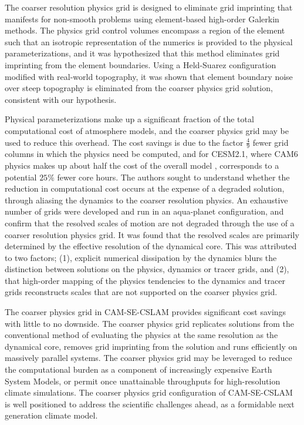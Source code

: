 \documentclass{agujournal}
\begin{document}
The coarser resolution physics grid is designed to eliminate grid imprinting that manifests for non-smooth problems using element-based high-order Galerkin methods. The physics grid control volumes encompass a region of the element such that an isotropic representation of the numerics is provided to the physical parameterizations, and it was hypothesized that this method eliminates grid imprinting from the element boundaries. Using a Held-Suarez configuration modified with real-world topography, it was shown that element boundary noise over steep topography is eliminated from the coarser physics grid solution, consistent with our hypothesis.

Physical parameterizations make up a significant fraction of the total computational cost of atmosphere models, and the coarser physics grid may be used to reduce this overhead. The cost savings is due to the factor $\frac{4}{9}$ fewer grid columns in which the physics need be computed, and for CESM2.1, where CAM6 physics makes up about half the cost of the overall model \citep{LetAl2018JAMES}, corresponds to a potential $25\%$ fewer core hours. The authors sought to understand whether the reduction in computational cost occurs at the expense of a degraded solution, through aliasing the dynamics to the coarser resolution physics. An exhaustive number of grids were developed and run in an aqua-planet configuration, and confirm that the resolved scales of motion are not degraded through the use of a coarser resolution physics grid. It was found that the resolved scales are primarily determined by the effective resolution of the dynamical core. This was attributed to two factors; (1), explicit numerical dissipation by the dynamics blurs the distinction between solutions on the physics, dynamics or tracer grids, and (2), that high-order mapping of the physics tendencies to the dynamics and tracer grids reconstructs scales that are not supported on the coarser physics grid.

The coarser physics grid in CAM-SE-CSLAM provides significant cost savings with little to no downside. The coarser physics grid replicates solutions from the conventional method of evaluating the physics at the same resolution as the dynamical core, removes grid imprinting from the solution and runs efficiently on massively parallel systems. The coarser physics grid may be leveraged to reduce the computational burden as a component of increasingly expensive Earth System Models, or permit once unattainable throughputs for high-resolution climate simulations. The coarser physics grid configuration of CAM-SE-CSLAM is well positioned to address the scientific challenges ahead, as a formidable next generation climate model.
\end{document}
